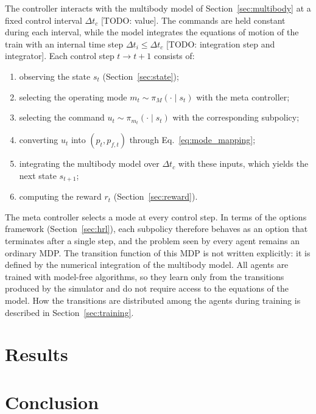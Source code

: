 \documentclass[preprint,10pt]{elsarticle}
\begin{document}
The controller interacts with the multibody model of Section~\ref{sec:multibody} at a fixed control interval $\Delta t_c$ [TODO: value]. The commands are held constant during each interval, while the model integrates the equations of motion of the train with an internal time step $\Delta t_i \leq \Delta t_c$ [TODO: integration step and integrator]. Each control step $t \to t+1$ consists of:
\begin{enumerate}
    \item observing the state $s_t$ (Section~\ref{sec:state});
    \item selecting the operating mode $m_t \sim \pi_M(\cdot \mid s_t)$ with the meta controller;
    \item selecting the command $u_t \sim \pi_{m_t}(\cdot \mid s_t)$ with the corresponding subpolicy;
    \item converting $u_t$ into $(p_t, p_{f,t})$ through Eq.~\eqref{eq:mode_mapping};
    \item integrating the multibody model over $\Delta t_c$ with these inputs, which yields the next state $s_{t+1}$;
    \item computing the reward $r_t$ (Section~\ref{sec:reward}).
\end{enumerate}
The meta controller selects a mode at every control step. In terms of the options framework (Section~\ref{sec:hrl}), each subpolicy therefore behaves as an option that terminates after a single step, and the problem seen by every agent remains an ordinary MDP. The transition function of this MDP is not written explicitly: it is defined by the numerical integration of the multibody model. All agents are trained with model-free algorithms, so they learn only from the transitions produced by the simulator and do not require access to the equations of the model. How the transitions are distributed among the agents during training is described in Section~\ref{sec:training}.


\newpage
    
\section{Results} \label{sec5}
    
    
\newpage
    
\section{Conclusion} \label{sec6}
    
    
    
\end{document}
